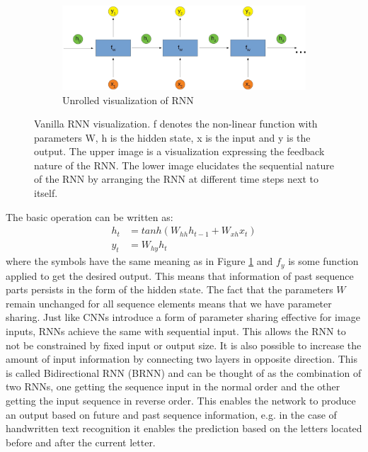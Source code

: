 \documentclass{article}
\begin{document}
\begin{figure}[H]
\begin{subfigure}{1\textwidth}
        \centering
        \includegraphics[scale=0.2]{rsz_rnn_unroll2}
        \caption{Unrolled visualization of RNN}
    \end{subfigure}
    \caption{Vanilla RNN visualization. f denotes the non-linear function with parameters W, h is the hidden state, x is the input and y is the output. The upper image is a visualization expressing the feedback nature of the RNN. The lower image elucidates the sequential nature of the RNN by arranging the RNN at different time steps next to itself.}
\label{fig:RNNArchitecture}
\end{figure}
The basic operation can be written as:
\[
\begin{split}
h_t &= tanh(W_{hh} h_{t-1} + W_{xh} x_t)\\
y_t &= W_{hy} h_t
\end{split}
\]
where the symbols have the same meaning as in Figure \ref{fig:RNNArchitecture} and \(f_y\) is some function applied to get the desired output. This means that information of past sequence parts persists in the form of the hidden state. The fact that the parameters \(W\) remain unchanged for all sequence elements means that we have parameter sharing. Just like CNNs introduce a form of parameter sharing effective for image inputs, RNNs achieve the same with sequential input. This allows the RNN to not be constrained by fixed input or output size. It is also possible to increase the amount of input information by connecting two layers in opposite direction. This is called Bidirectional RNN (BRNN) and can be thought of as the combination of two RNNs, one getting the sequence input in the normal order and the other getting the input sequence in reverse order. This enables the network to produce an output based on future and past sequence information, e.g. in the case of handwritten text recognition it enables the prediction based on the letters located before and after the current letter.
\end{document}
